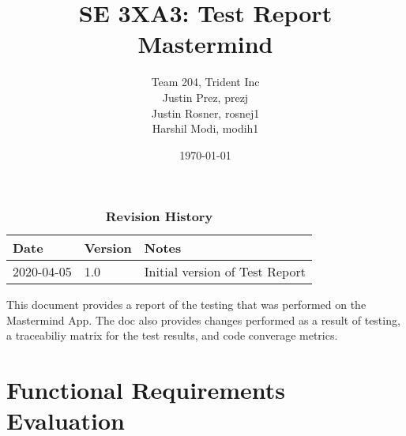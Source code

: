 \documentclass[12pt, titlepage]{article}
\title{SE 3XA3: Test Report\\Mastermind}
\author{Team 204, Trident Inc
		\\ Justin Prez, prezj
		\\ Justin Rosner, rosnej1
		\\ Harshil Modi, modih1
}
\date{\today}
\begin{document}
\maketitle

\tableofcontents
\listoftables
\listoffigures

\begin{table}[H]
\caption{\bf Revision History}
\begin{tabularx}{\textwidth}{p{3cm}p{2cm}X}
\toprule {\bf Date} & {\bf Version} & {\bf Notes}\\
\midrule
2020-04-05 & 1.0 & Initial version of Test Report\\
\bottomrule
\end{tabularx}
\end{table}

\newpage


This document provides a report of the testing that was performed on the Mastermind App. The doc also provides changes performed as a result of testing, a traceabiliy matrix for the test results, and code converage metrics.

\section{Functional Requirements Evaluation}
\end{document}
